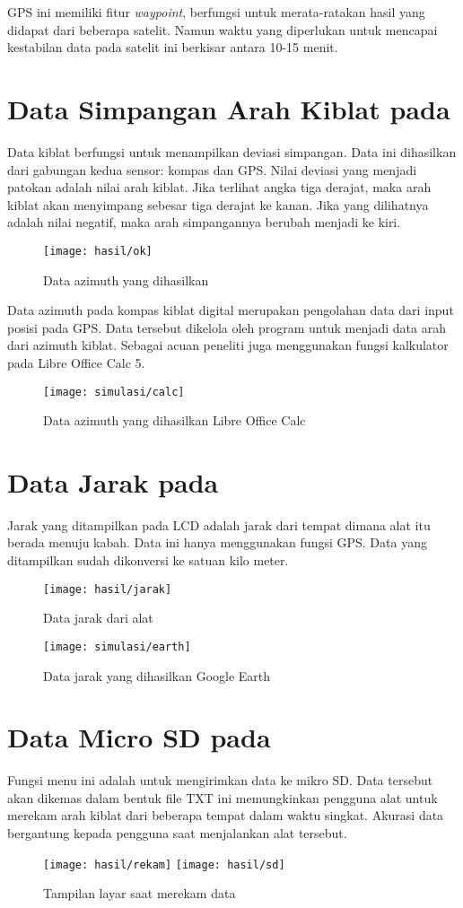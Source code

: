 GPS ini memiliki fitur \textit{waypoint}, berfungsi untuk merata-ratakan hasil yang didapat dari beberapa satelit. Namun waktu yang diperlukan untuk mencapai kestabilan data pada satelit ini berkisar antara 10-15 menit.
\section{Data Simpangan Arah Kiblat pada \Alat}
Data kiblat berfungsi untuk menampilkan deviasi simpangan. Data ini dihasilkan dari gabungan kedua sensor: kompas dan GPS. Nilai deviasi yang menjadi patokan adalah nilai arah kiblat. Jika terlihat angka tiga derajat, maka arah kiblat akan menyimpang sebesar tiga derajat ke kanan. Jika yang dilihatnya adalah nilai negatif, maka arah simpangannya berubah menjadi ke kiri.
\begin{figure}
\centering
\texttt{[image: hasil/ok]}
\caption{Data azimuth yang dihasilkan \alat}
\end{figure}
Data azimuth pada kompas kiblat digital merupakan pengolahan data dari input posisi pada GPS. Data tersebut dikelola oleh program untuk menjadi data arah dari azimuth kiblat. Sebagai acuan peneliti juga menggunakan fungsi kalkulator pada Libre Office Calc 5.  
\begin{figure}
\centering
\texttt{[image: simulasi/calc]}
\caption{Data azimuth yang dihasilkan Libre Office Calc}
\end{figure}
\section{Data Jarak pada \Alat}
Jarak yang ditampilkan pada LCD adalah jarak dari tempat dimana alat itu berada menuju kabah. Data ini hanya menggunakan fungsi GPS. Data yang ditampilkan sudah dikonversi ke satuan kilo meter.
\begin{figure}
\centering
\texttt{[image: hasil/jarak]}
\caption{Data jarak dari alat \alat}
\end{figure}
\begin{figure}
\centering
\texttt{[image: simulasi/earth]}
\caption{Data jarak yang dihasilkan Google Earth}
\end{figure}
\section{Data Micro SD pada \Alat}
Fungsi menu ini adalah untuk mengirimkan data ke mikro SD. Data tersebut akan dikemas dalam bentuk file TXT ini memungkinkan pengguna alat untuk merekam arah kiblat dari beberapa tempat dalam waktu singkat. Akurasi data bergantung kepada pengguna saat menjalankan alat tersebut.
\begin{figure}
\centering
\texttt{[image: hasil/rekam]}
\texttt{[image: hasil/sd]}
\caption{Tampilan layar saat merekam data}
\end{figure}

